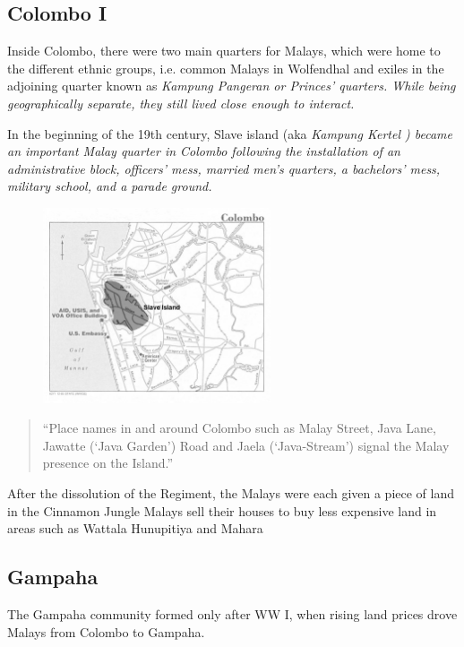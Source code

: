 \subsection{Colombo I}\label{sec:slmbg:ColomboI}

Inside Colombo, there were two main quarters for Malays, which were home to the different ethnic groups, i.e. common Malays in Wolfendhal and exiles in the adjoining quarter known as \em Kampung Pangeran \em or Princes' quarters. While being geographically separate, they still lived close enough to interact.

In the beginning of the 19th century, Slave island (aka \em Kampung Kertel \em) became an important Malay quarter in Colombo following the installation of an administrative block, officers' mess, married men's quarters, a bachelors' mess, military school, and a parade ground.

\begin{figure}
    \centering
        \includegraphics[width=0.60\textwidth]{pics/colombomod}
    \label{fig:colombomod}
\end{figure}

\begin{quotation}
    ``Place names in and around Colombo such as Malay Street, Java Lane, Jawatte (`Java Garden') Road and Jaela (`Java-Stream') signal the Malay presence on the Island.''\citet[12]{Jayasuriya2002}
\end{quotation}

After the dissolution of the Regiment, the Malays were each given a piece of land in the Cinnamon Jungle
Malays sell their houses to buy less expensive land in areas such as Wattala Hunupitiya and Mahara

\subsection{Gampaha}\label{sec:slmbg:Gampaha}
The Gampaha community formed only after WW I, when rising land
prices drove Malays from Colombo to
Gampaha.\citet[cf.][2]{Bichsel}

